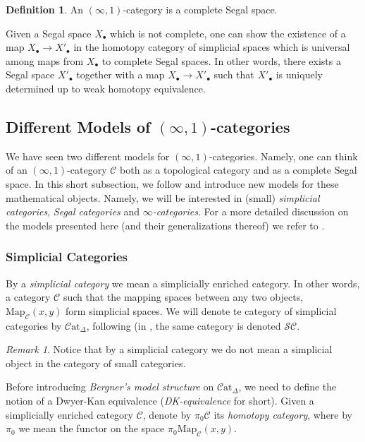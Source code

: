 \documentclass[a4paper,11pt]{article}
\newcommand{\ccal}{\mathcal{C}}
\newcommand{\scal}{\mathcal{S}}
\theoremstyle{plain}
\theoremstyle{definition}
\newtheorem{defi}[thm]{Definition}
\theoremstyle{remark}
\newtheorem*{rem}{Remark}
\begin{document}
\begin{defi}
An $(\infty, 1)$-category is a complete Segal space. 
\end{defi}


Given a Segal space $X_{\bullet}$ which is not complete, one can show the existence of a map $X_{\bullet} \to X'_{\bullet}$ in the homotopy category of simplicial spaces which is universal among maps from $X_{\bullet}$ to complete Segal spaces. In other words, there exists a Segal space $X'_{\bullet}$ together with a map $X_{\bullet} \to X'_{\bullet}$ such that $X'_{\bullet}$ is uniquely determined up to weak homotopy equivalence. 

\subsection{Different Models of $(\infty, 1)$-categories}


We have seen two different models for $(\infty, 1)$-categories. Namely, one can think of an $(\infty, 1)$-category $\ccal$ both as a topological category and as a complete Segal space. In this short subsection, we follow \cite{bergner} and introduce new models for these mathematical objects. Namely, we will be interested in (small) \textit{simplicial categories}, \textit{Segal categories} and \textit{$\infty$-categories}. For a more detailed discussion on the models presented here (and their generalizations thereof) we refer to \cite{lurie2}. 

\subsubsection{Simplicial Categories}


By a \textit{simplicial category} we mean a simplicially enriched category. In other words, a category $\ccal$ such that the mapping spaces between any two objects, $\text{Map}_{\ccal}(x,y)$ form simplicial spaces. We will denote te category of simplicial categories by $\ccal \text{at}_{\Delta}$, following \cite{lurie2} (in \cite{bergner}, the same category is denoted $\scal \ccal$.

\begin{rem}
Notice that by a simplicial category we do not mean a simplicial object in the category of small categories.
\end{rem}


Before introducing \textit{Bergner's model structure} on $\ccal\text{at}_{\Delta}$, we need to define the notion of a Dwyer-Kan equivalence (\textit{DK-equivalence} for short). Given a simplicially enriched category $\ccal$, denote by $\pi_0 \ccal$ its \textit{homotopy category}, where by $\pi_0$ we mean the  functor on the space $\pi_0 \text{Map}_{\ccal}(x,y)$. 
\end{document}
